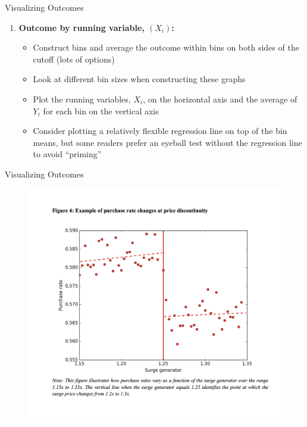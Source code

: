 \documentclass{beamer}
\begin{document}
\begin{frame}{Visualizing Outcomes}
	
	\begin{enumerate}
	\item \textbf{Outcome by running variable, $(X_i)$:}
		\begin{itemize}
		\item Construct bins and average the outcome within bins on both sides of the cutoff (lots of options)
		\item Look at different bin sizes when constructing these graphs 
		\item Plot the running variables, $X_i$, on the horizontal axis and the average of $Y_i$ for each bin on the vertical axis
		\item Consider plotting a relatively flexible regression line on top of the bin means, but some readers prefer an eyeball test without the regression line to avoid ``priming''
		\end{itemize}
	\end{enumerate}
\end{frame}

\begin{frame}{Visualizing Outcomes}

	\begin{figure}
	\includegraphics[scale=0.32]{./lecture_includes/uber_surge}
	\end{figure}
	
\end{frame}
\end{document}
